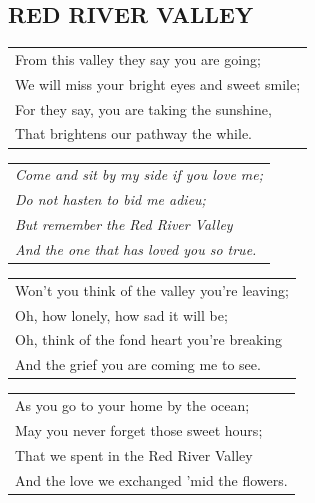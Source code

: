 \documentclass{article}
\begin{document}
\subsection*{RED RIVER VALLEY}
\begin{flushleft}
\begin{tabularx}{\textwidth} {
    >{\raggedright\arraybackslash}X}
From this valley they say you are going;\\
We will miss your bright eyes and sweet smile;\\
For they say, you are taking the sunshine,\\
That brightens our pathway the while.\\
\end{tabularx}
\end{flushleft}
\begin{flushleft}
\begin{tabularx}{\textwidth} {
    >{\raggedright\arraybackslash}X}
\textit{Come and sit by my side if you love me;}\\
\textit{Do not hasten to bid me adieu;}\\
\textit{But remember the Red River Valley}\\
\textit{And the one that has loved you so true.}\\
\end{tabularx}
\end{flushleft}
\begin{flushleft}
\begin{tabularx}{\textwidth} {
    >{\raggedright\arraybackslash}X}
Won’t you think of the valley you’re leaving;\\
Oh, how lonely, how sad it will be;\\
Oh, think of the fond heart you’re breaking\\
And the grief you are coming me to see.\\
\end{tabularx}
\end{flushleft}
\begin{flushleft}
\begin{tabularx}{\textwidth} {
    >{\raggedright\arraybackslash}X}
As you go to your home by the ocean;\\
May you never forget those sweet hours;\\
That we spent in the Red River Valley\\
And the love we exchanged ’mid the flowers.\\
\end{tabularx}
\end{flushleft}
\end{document}
